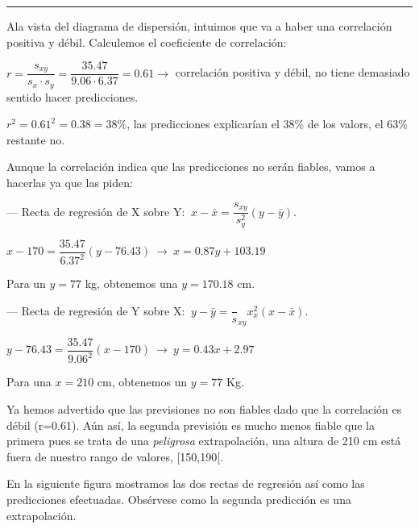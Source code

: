 \begin{example}
\vspace{-3mm} \begin{center}\textcolor{green}{\rule{100mm}{0.1mm}}\end{center}

Ala vista del diagrama de dispersión, intuimos que va a haber una correlación positiva y débil. Calculemos el coeficiente de correlación:

\vspace{2mm} $r=\dfrac{s_{xy}}{s_x\cdot s_y}=\dfrac{35.47}{9.06\cdot 6.37}=0.61 \to$ correlación positiva y débil, no tiene demasiado sentido hacer predicciones.

\vspace{2mm} $r^2=0.61^2=0.38=38\%$, las predicciones explicarían el 38\% de los valors, el 63\% restante no.

\vspace{2mm} Aunque la correlación indica que las predicciones no serán fiables, vamos a hacerlas ya que las piden:

\vspace{2mm} --- Recta de regresión de X sobre Y:  $\ x-\bar x=\dfrac{s_{xy}}{s_y^2}(y-\bar y)$.

\vspace{2mm} $x-170=\dfrac{35.47}{6.37^2}(y-76.43) \ \to \ x=0.87y+103.19$

\vspace{2mm} Para un $y=77$ kg, obtenemos una $y=170.18$ cm.

\vspace{2mm} --- Recta de regresión de Y sobre X: $\ y-\bar y=\dfrac{}s_{xy}{x_x^2}(x-\bar x)$.

\vspace{2mm} $y-76.43=\dfrac{35.47}{9.06^2}(x-170) \ \to \ y=0.43x+2.97$

\vspace{2mm} Para una $x=210$ cm, obtenemos un $y=77$ Kg.

\vspace{2mm} Ya hemos advertido que las previsiones no son fiables dado que la correlación es débil (r=0.61). Aún así, la segunda previsión es mucho menos fiable que la primera pues se trata de una \emph{peligrosa} extrapolación, una altura de 210 cm está fuera de nuestro rango de valores, [150,190[.

En la siguiente figura mostramos las dos rectas de regresión así como las predicciones efectuadas. Obsérvese como la segunda predicción es una extrapolación.

\vspace{1cm} %
 

\end{example}

